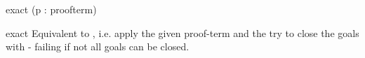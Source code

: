 \begin{tactic}{exact (p : proofterm)}
  \begin{tsyntax}[empty]{exact}
  Equivalent to , i.e. apply the given
  proof-term and the try to close the goals with  - failing
  if not all goals can be closed.
  \end{tsyntax}
\end{tactic}
